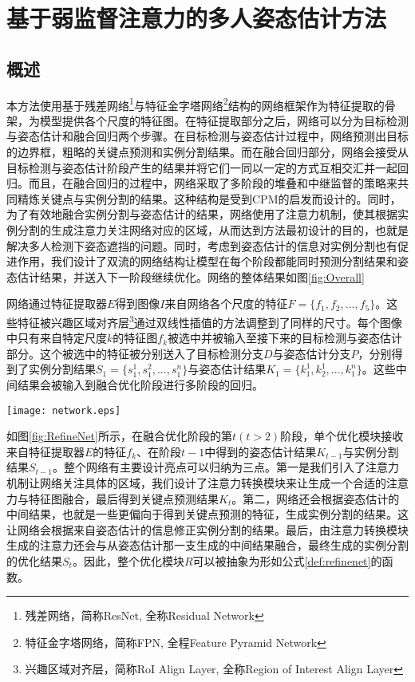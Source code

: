 \chapter{基于弱监督注意力的多人姿态估计方法}
\label{cha:method}

\section{概述}
\label{sec:methodoverview}
本方法使用基于残差网络\footnote{残差网络，简称ResNet, 全称Residual Network}与特征金字塔网络\footnote{特征金字塔网络，简称FPN, 全程Feature Pyramid Network}结构的网络框架作为特征提取的骨架，为模型提供各个尺度的特征图。在特征提取部分之后，网络可以分为目标检测与姿态估计和融合回归两个步骤。在目标检测与姿态估计过程中，网络预测出目标的边界框，粗略的关键点预测和实例分割结果。而在融合回归部分，网络会接受从目标检测与姿态估计阶段产生的结果并将它们一同以一定的方式互相交汇并一起回归。而且，在融合回归的过程中，网络采取了多阶段的堆叠和中继监督的策略来共同精炼关键点与实例分割的结果。这种结构是受到CPM\cite{wei2016convolutional}的启发而设计的。同时，为了有效地融合实例分割与姿态估计的结果，网络使用了注意力机制，使其根据实例分割的生成注意力关注网络对应的区域，从而达到方法最初设计的目的，也就是解决多人检测下姿态遮挡的问题。同时，考虑到姿态估计的信息对实例分割也有促进作用，我们设计了双流的网络结构让模型在每个阶段都能同时预测分割结果和姿态估计结果，并送入下一阶段继续优化。网络的整体结果如图\ref{fig:Overall}

网络通过特征提取器$E$得到图像$I$来自网络各个尺度的特征$F=\{f_1, f_2, ..., f_5\}$。这些特征被兴趣区域对齐层\footnote{兴趣区域对齐层，简称RoI Align Layer, 全称Region of Interest Align Layer}通过双线性插值的方法调整到了同样的尺寸。每个图像中只有来自特定尺度$k$的特征图$f_k$被选中并被输入至接下来的目标检测与姿态估计部分。这个被选中的特征被分别送入了目标检测分支$D$与姿态估计分支$P$，分别得到了实例分割结果$S_1=\{s_1^1, s_1^2, ..., s_1^n\}$与姿态估计结果$K_1=\{k_1^1, k_2^1, ..., k_1^n\}$。这些中间结果会被输入到融合优化阶段进行多阶段的回归。

\begin{figure*}[htbp]	
	\centering
	\texttt{[image: network.eps]}
	\caption{网络整体结构}
	\label{fig:Overall}
\end{figure*}

如图\ref{fig:RefineNet}所示，在融合优化阶段的第$t(t>2)$阶段，单个优化模块接收来自特征提取器$E$的特征$f_k$、在阶段$t-1$中得到的姿态估计结果$K_{t-1}$与实例分割结果$S_{t-1}$。整个网络有主要设计亮点可以归纳为三点。第一是我们引入了注意力机制让网络关注具体的区域，我们设计了注意力转换模块来让生成一个合适的注意力与特征图融合，最后得到关键点预测结果$K_t$。第二，网络还会根据姿态估计的中间结果，也就是一些更偏向于得到关键点预测的特征，生成实例分割的结果。这让网络会根据来自姿态估计的信息修正实例分割的结果。最后，由注意力转换模块生成的注意力还会与从姿态估计那一支生成的中间结果融合，最终生成的实例分割的优化结果$S_t$。因此，整个优化模块$R$可以被抽象为形如公式\eqref{def:refinenet}的函数。


